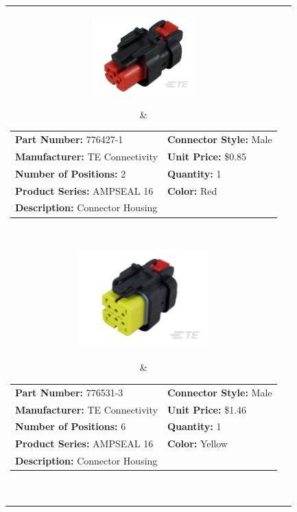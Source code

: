 \documentclass[12pt,letterpaper]{article}
\begin{document}
\begin{longtable}{c l}

\parbox[c]{4cm}{\includegraphics[width=4cm]{776427-1.png} }
& \begin{tabular}{l l}
\textbf{Part Number:} 776427-1 & \textbf{Connector Style:} Male \\
\textbf{Manufacturer:} TE Connectivity & \textbf{Unit Price:} \$0.85 \\
\textbf{Number of Positions:} 2 & \textbf{Quantity:} 1 \\
\textbf{Product Series:} AMPSEAL 16 & \textbf{Color:} Red \\
\textbf{Description:} Connector Housing & \\
\end{tabular} \\

\parbox[c]{5cm}{\includegraphics[width=5cm]{776531-3.png} }
& \begin{tabular}{l l}
\textbf{Part Number:} 776531-3 & \textbf{Connector Style:} Male \\
\textbf{Manufacturer:} TE Connectivity & \textbf{Unit Price:} \$1.46 \\
\textbf{Number of Positions:} 6 & \textbf{Quantity:} 1 \\
\textbf{Product Series:} AMPSEAL 16 & \textbf{Color:} Yellow \\
\textbf{Description:} Connector Housing & \\
\end{tabular} \\


\end{longtable}
\end{document}
